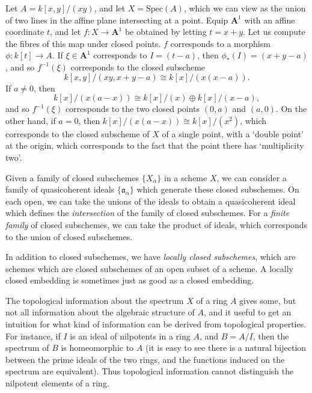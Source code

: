 \begin{example}
    Let $A = k[x,y]/(xy)$, and let $X = \text{Spec}(A)$, which we can view as the union of two lines in the affine plane intersecting at a point. Equip $\mathbf{A}^1$ with an affine coordinate $t$, and let $f: X \to \mathbf{A}^1$ be obtained by letting $t = x + y$. Let us compute the fibres of this map under closed points. $f$ corresponds to a morphism $\phi: k[t] \to A$. If $\xi \in \mathbf{A}^1$ corresponds to $I = (t - a)$, then $\phi_*(I) = (x + y - a)$, and so $f^{-1}(\xi)$ corresponds to the closed subscheme
    \[ k[x,y]/(xy,x + y - a) \cong k[x]/(x(x - a)). \]
    If $a \neq 0$, then
    \[ k[x]/(x(a-x)) \cong k[x]/(x) \oplus k[x]/(x - a), \]
    and so $f^{-1}(\xi)$ corresponds to the two closed points $(0,a)$ and $(a,0)$. On the other hand, if $a = 0$, then $k[x]/(x(a-x)) \cong k[x]/(x^2)$, which corresponds to the closed subscheme of $X$ of a single point, with a `double point' at the origin, which corresponds to the fact that the point there has `multiplicity two'.
\end{example}

Given a family of closed subschemes $\{ X_\alpha \}$ in a scheme $X$, we can consider a family of quasicoherent ideals $\{ \mathfrak{a}_\alpha \}$ which generate these closed subschemes. On each open, we can take the unions of the ideals to obtain a quasicoherent ideal which defines the \emph{intersection} of the family of closed subschemes. For a \emph{finite family} of closed subschemes, we can take the product of ideals, which corresponds to the union of closed subschemes.

In addition to closed subschemes, we have \emph{locally closed subschemes}, which are schemes which are closed subschemes of an open subset of a scheme. A locally closed embedding is sometimes just as good as a closed embedding.

The topological information about the spectrum $X$ of a ring $A$ gives some, but not all information about the algebraic structure of $A$, and it useful to get an intuition for what kind of information can be derived from topological properties. For instance, if $I$ is an ideal of nilpotents in a ring $A$, and $B = A/I$, then the spectrum of $B$ is homeomorphic to $A$ (it is easy to see there is a natural bijection between the prime ideals of the two rings, and the functions induced on the spectrum are equivalent). Thus topological information cannot distinguish the nilpotent elements of a ring.

